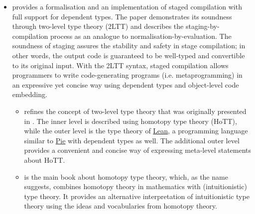 \begin{itemize}
\item \cite{staged} provides a formalisation and an implementation of staged compilation with full support for dependent types. The paper demonstrates its soundness through two-level type theory (2LTT) and describes the staging-by-compilation process as an analogue to normalisation-by-evaluation. The soundness of staging assures the stability and safety in stage compilation; in other words, the output code is guaranteed to be well-typed and convertible to its original input. With the 2LTT syntax, staged compilation allows programmers to write code-generating programs (i.e. metaprogramming) in an expressive yet concise way using dependent types and object-level code embedding.
\begin{itemize}
    \item \cite{2ltt} refines the concept of two-level type theory that was originally presented in \cite{2lttog}. The inner level is described using homotopy type theory (HoTT), while the outer level is the type theory of \href{https://leanprover.github.io/}{Lean}, a programming language similar to \href{https://github.com/the-little-typer/pie}{Pie} with dependent types as well. The additional outer level provides a convenient and concise way of expressing meta-level statements about HoTT.
    \item \cite{hott} is the main book about homotopy type theory, which, as the name suggests, combines homotopy theory in mathematics with (intuitionistic) type theory. It provides an alternative interpretation of intuitionistic type theory using the ideas and vocabularies from homotopy theory.
\end{itemize}

\end{itemize}